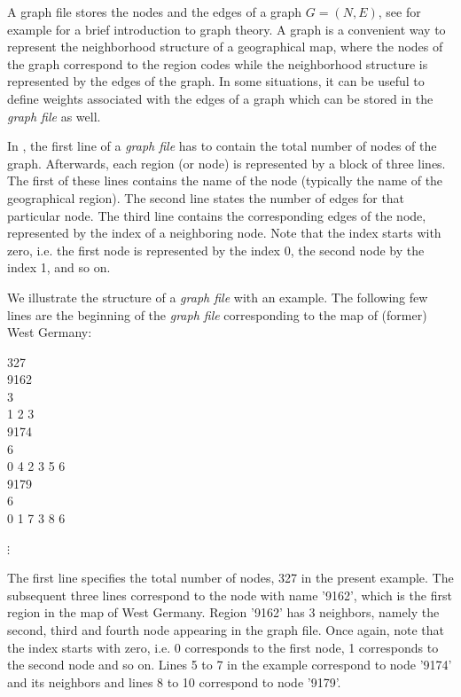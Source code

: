 A graph file stores the nodes and the edges of a graph $G = (N,E)$, see for example  for a brief introduction to graph theory. A graph is a convenient way to represent the neighborhood structure of a geographical map, where the nodes of the graph correspond to the region codes while the neighborhood structure is represented by the edges of the graph. In some situations, it can be useful to define weights associated with the edges of a graph which can be stored in the {\em graph file} as well.

In \BayesX, the first line of a {\em graph file} has to contain the total number of nodes of the graph. Afterwards, each
region (or node) is represented by a block of three lines. The first of these lines contains the name of the node (typically the name of the geographical region). The second line states the number of edges for that particular node. The third line contains the corresponding edges of the node, represented by the index of a neighboring node. Note that the index starts with zero, i.e. the first node is represented by the index 0, the second node by the index 1, and so on.

We illustrate the structure of a {\em graph file} with an example. The following few lines are the beginning of the {\em graph file} corresponding to the map of (former) West Germany:

\footnotesize

327 \\
9162 \\
3 \\
1 2 3 \\
9174 \\
6 \\
0 4 2 3 5 6 \\
9179 \\
6 \\
0 1 7 3 8 6

\hspace{1cm} $\vdots$

\normalsize

\vspace{0.5cm}

The first line specifies the total number of nodes, 327 in the present example. The subsequent three lines correspond to the node with name '9162', which is the first region in the map of West Germany. Region '9162' has 3 neighbors, namely the second, third and fourth node appearing in the graph file. Once again, note that the index starts with zero, i.e. 0 corresponds to the first node, 1 corresponds to the second node and so on. Lines 5 to 7 in the example correspond to node '9174' and its neighbors and lines 8 to 10 correspond to node '9179'.

